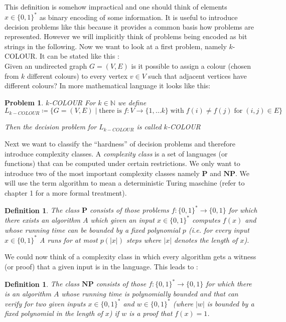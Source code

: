 \documentclass[12pt,a4paper]{scrartcl}
\newtheorem{Definition}[Theorem]{Definition}
\newtheorem{Problem}{Problem}
\numberwithin{equation}{section}
\newcommand{\N}{\mathbb{N}} %
\newcommand{\Pcomplexity}{\mathbf{P}}
\newcommand{\NPcomplexity}{\mathbf{NP}}
\begin{document}
This definition is somehow impractical and one should think of elements $x \in {\lbrace 0,1 \rbrace}^*$ as binary encoding
of some information. It is useful to introduce decision problems like this because it provides a common basis how problems
are represented. However we will implicitly think of problems being encoded as bit strings in the following. Now
we want to look at a first problem, namely $k$-COLOUR. It can be stated like this : \\
 Given an undirected graph $ G = (V,E)$ is it possible to assign a colour (chosen from $k$ different colours) to every vertex 
 $v \in V$ such that adjacent vertices have different colours? In more mathematical language it looks like this:

\begin{Problem}{$k$-COLOUR}
 For $k \in \N$ we define $$L_{k-COLOUR} \coloneqq \lbrace G  = (V,E) \; | \; \text{there is} \; f \colon V \to \lbrace 1, \dotsc k \rbrace
 \; \text{with} \; f(i) \neq f(j) \; \text{for} \; (i,j) \in E \rbrace $$
 
 Then the decision problem for $L_{k-COLOUR}$ is called \emph{$k$-COLOUR}
\end{Problem}

Next we want to classify the ``hardness'' of decision problems and therefore introduce complexity classes. A \emph{complexity class}
 is a set of languages (or functions) that can be computed under certain restrictions. We only want to introduce two 
 of the most important complexity classes namely $\Pcomplexity$ and $\NPcomplexity$. We will use the term algorithm
 to mean a deterministic Turing maschine (refer to \cite{Arora2009} chapter 1 for a more formal treatment). 
 
\begin{Definition}
 The class $\Pcomplexity$ consists of those problems $f \colon {\lbrace 0,1 \rbrace}^* \to {\lbrace 0,1 \rbrace}$ for
 which there exists an algorithm $A$ which given an input $x \in {\lbrace 0,1 \rbrace}^*$
 computes $f(x)$ and whose running time can be bounded by a fixed polynomial $p$ (i.e.
 for every input $x \in {\lbrace 0,1 \rbrace}^*$ A runs for at most $p(|x|)$ steps where $|x|$ denotes the length of $x$).
\end{Definition}

We could now think of a complexity class in which every algorithm gets a witness (or proof) that a given input is in the language.
This leads to :

\begin{Definition}
 The class $\NPcomplexity$ consists of those $f \colon {\lbrace 0,1 \rbrace}^* \to {\lbrace 0,1 \rbrace}$ for which there is
 an algorithm $A$ whose running time is polynomially bounded and that can verify for two given inputs $x \in {\lbrace 0,1 \rbrace}^*$ and 
 $w \in {\lbrace 0,1 \rbrace}^*$ (where $|w|$ is bounded by a fixed polynomial in the length of $x$) if $w$ is a proof
 that $f(x) = 1$.
\end{Definition}
\end{document}
